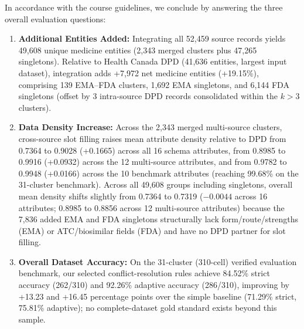 \documentclass{llncs}
\begin{document}
In accordance with the course guidelines, we conclude by answering the three overall evaluation questions:
\begin{enumerate}
  \item \textbf{Additional Entities Added:} Integrating all 52,459 source records yields 49,608 unique medicine entities (2,343 merged clusters plus 47,265 singletons). Relative to Health Canada DPD (41,636 entities, largest input dataset), integration adds +7,972 net medicine entities (+19.15\%), comprising 139 EMA--FDA clusters, 1,692 EMA singletons, and 6,144 FDA singletons (offset by 3 intra-source DPD records consolidated within the $k > 3$ clusters).
  \item \textbf{Data Density Increase:} Across the 2,343 merged multi-source clusters, cross-source slot filling raises mean attribute density relative to DPD from 0.7364 to 0.9028 (+0.1665) across all 16 schema attributes, from 0.8985 to 0.9916 (+0.0932) across the 12 multi-source attributes, and from 0.9782 to 0.9948 (+0.0166) across the 10 benchmark attributes (reaching 99.68\% on the 31-cluster benchmark). Across all 49,608 groups including singletons, overall mean density shifts slightly from 0.7364 to 0.7319 ($-0.0044$ across 16 attributes; 0.8985 to 0.8856 across 12 multi-source attributes) because the 7,836 added EMA and FDA singletons structurally lack form/route/strengths (EMA) or ATC/biosimilar fields (FDA) and have no DPD partner for slot filling.
  \item \textbf{Overall Dataset Accuracy:} On the 31-cluster (310-cell) verified evaluation benchmark, our selected conflict-resolution rules achieve 84.52\% strict accuracy (262/310) and 92.26\% adaptive accuracy (286/310), improving by +13.23 and +16.45 percentage points over the simple baseline (71.29\% strict, 75.81\% adaptive); no complete-dataset gold standard exists beyond this sample.
\end{enumerate}







\end{document}
